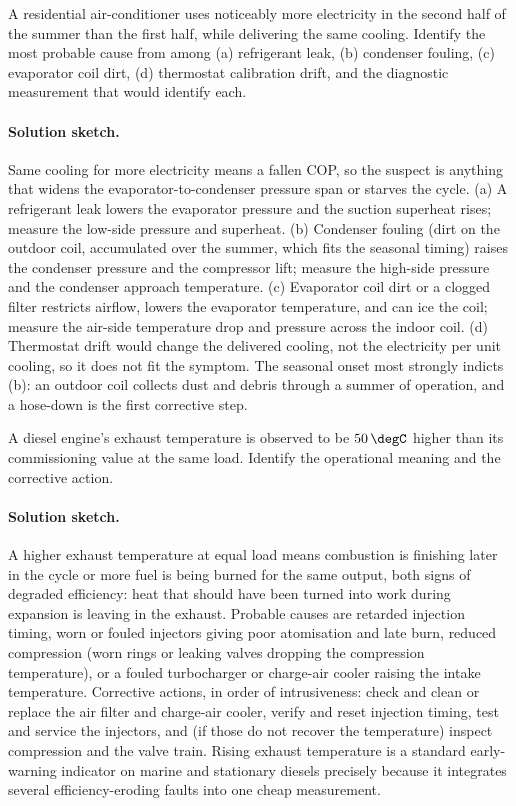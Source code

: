 \begin{exercise}
A residential air-conditioner uses noticeably more electricity in
the second half of the summer than the first half, while delivering
the same cooling. Identify the most probable cause from among (a)
refrigerant leak, (b) condenser fouling, (c) evaporator coil dirt,
(d) thermostat calibration drift, and the diagnostic measurement that
would identify each.

\paragraph{Solution sketch.} Same cooling for more electricity means a
fallen COP, so the suspect is anything that widens the
evaporator-to-condenser pressure span or starves the cycle. (a) A
refrigerant leak lowers the evaporator pressure and the suction
superheat rises; measure the low-side pressure and superheat. (b)
Condenser fouling (dirt on the outdoor coil, accumulated over the
summer, which fits the seasonal timing) raises the condenser pressure
and the compressor lift; measure the high-side pressure and the
condenser approach temperature. (c) Evaporator coil dirt or a clogged
filter restricts airflow, lowers the evaporator temperature, and can
ice the coil; measure the air-side temperature drop and pressure across
the indoor coil. (d) Thermostat drift would change the delivered
cooling, not the electricity per unit cooling, so it does not fit the
symptom. The seasonal onset most strongly indicts (b): an outdoor coil
collects dust and debris through a summer of operation, and a hose-down
is the first corrective step.
\end{exercise}

\begin{exercise}
A diesel engine's exhaust temperature is observed to be $50\,\degC$
higher than its commissioning value at the same load. Identify the
operational meaning and the corrective action.

\paragraph{Solution sketch.} A higher exhaust temperature at equal load
means combustion is finishing later in the cycle or more fuel is being
burned for the same output, both signs of degraded efficiency: heat that
should have been turned into work during expansion is leaving in the
exhaust. Probable causes are retarded injection timing, worn or fouled
injectors giving poor atomisation and late burn, reduced compression
(worn rings or leaking valves dropping the compression temperature), or
a fouled turbocharger or charge-air cooler raising the intake
temperature. Corrective actions, in order of intrusiveness: check and
clean or replace the air filter and charge-air cooler, verify and reset
injection timing, test and service the injectors, and (if those do not
recover the temperature) inspect compression and the valve train.
Rising exhaust temperature is a standard early-warning indicator on
marine and stationary diesels precisely because it integrates several
efficiency-eroding faults into one cheap measurement.
\end{exercise}


